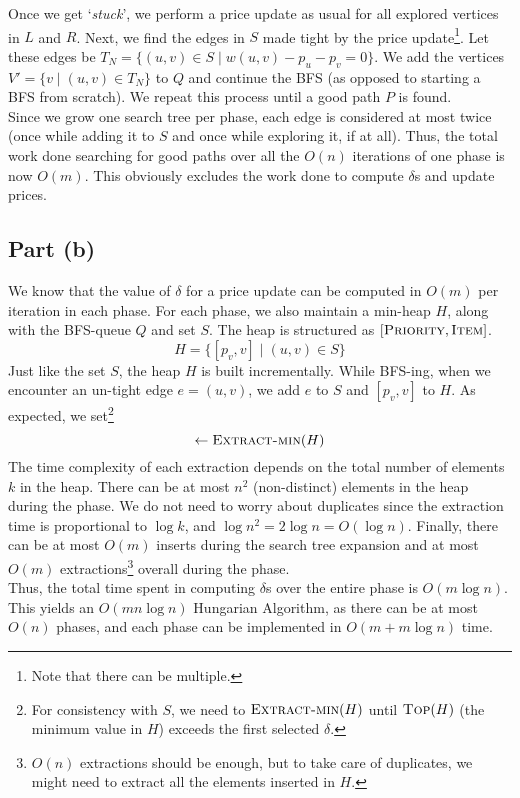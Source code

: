 \documentclass[9pt]{article}
\begin{document}
Once we get `\textit{stuck}', we perform a price update as usual for all explored vertices
in $L$ and $R$. Next, we find the edges in $S$ made tight by the price update\footnote{Note
that there can be multiple.}. Let these edges be
$T_{N} = \{ (u, v) \in S \mid w(u, v) - p_{u} - p_{v} = 0 \}$. We add the vertices
$V' = \{ v \mid (u, v) \in T_{N} \}$ to $Q$ and continue the BFS (as opposed to starting a
BFS from scratch). We repeat this process until a good path $P$ is found. \\
Since we grow one search tree per phase, each edge is considered at most twice (once while
adding it to $S$ and once while exploring it, if at all). Thus, the total work done searching
for good paths over all the $O(n)$ iterations of one phase is now $O(m)$. This obviously
excludes the work done to compute $\delta$s and update prices.

\subsection*{Part (b)}
We know that the value of $\delta$ for a price update can be computed in $O(m)$ per iteration
in each phase. For each phase, we also maintain a min-heap $H$, along with the BFS-queue $Q$
and set $S$. The heap is structured as $[\textsc{Priority}, \textsc{Item}]$.
\begin{equation}
    H = \{ [p_{v}, v] \mid (u, v) \in S \}
\end{equation}
Just like the set $S$, the heap $H$ is built incrementally. While BFS-ing, when we encounter
an un-tight edge $e = (u, v)$, we add $e$ to $S$ and $[p_{v}, v]$ to $H$. As expected, we
set\footnote{For consistency with $S$, we need to $\Call{Extract-min}{H}$ until $\Call{Top}{H}$
(the minimum value in $H$) exceeds the first selected $\delta$.}
\begin{equation}
    [\delta, \_] \gets \Call{Extract-min}{H}
\end{equation}
The time complexity of each extraction depends on the total number of elements $k$ in the heap.
There can be at most $n^{2}$ (non-distinct) elements in the heap during the phase. We do not
need to worry about duplicates since the extraction time is proportional to $\log{k}$, and
$\log{n^{2}} = 2 \log{n} = O(\log{n})$. Finally, there can be at most $O(m)$ inserts during the
search tree expansion and at most $O(m)$ extractions\footnote{$O(n)$ extractions should be
enough, but to take care of duplicates, we might need to extract all the elements inserted in
$H$.} overall during the phase. \\
Thus, the total time spent in computing $\delta$s over the entire phase is $O(m \log{n})$. This
yields an $O(mn \log{n})$ Hungarian Algorithm, as there can be at most $O(n)$ phases, and each
phase can be implemented in $O(m + m\log{n})$ time.
\end{document}
